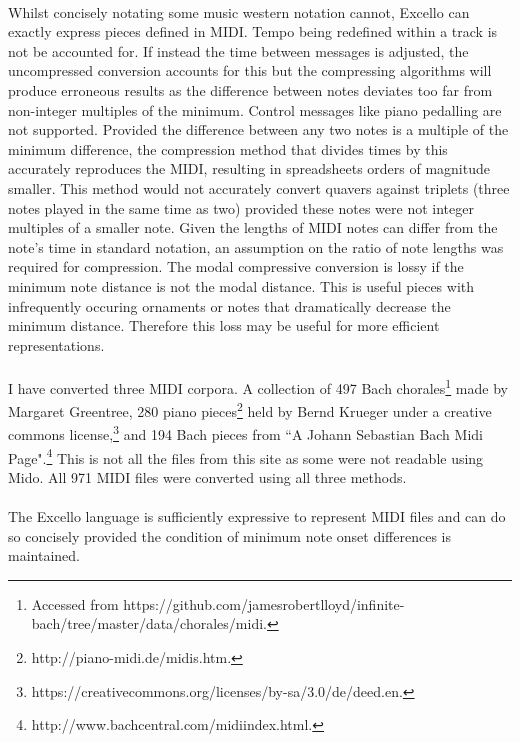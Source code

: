 \paragraph{} Whilst concisely notating some music western notation cannot, Excello can exactly express pieces defined in MIDI. Tempo being redefined within a track is not be accounted for. If instead the time between messages is adjusted, the uncompressed conversion accounts for this but the compressing algorithms will produce erroneous results as the difference between notes deviates too far from non-integer multiples of the minimum. Control messages like piano pedalling are not supported. Provided the difference between any two notes is a multiple of the minimum difference, the compression method that divides times by this accurately reproduces the MIDI, resulting in spreadsheets orders of magnitude smaller. This method would not accurately convert quavers against triplets (three notes played in the same time as two) provided these notes were not integer multiples of a smaller note. Given the lengths of MIDI notes can differ from the note's time in standard notation, an assumption on the ratio of note lengths was required for compression. The modal compressive conversion is lossy if the minimum note distance is not the modal distance. This is useful pieces with infrequently occuring ornaments or notes that dramatically decrease the minimum distance. Therefore this loss may be useful for more efficient representations.

\paragraph{} I have converted three MIDI corpora. A collection of 497 Bach chorales\footnote{Accessed from https://github.com/jamesrobertlloyd/infinite-bach/tree/master/data/chorales/midi.} made by Margaret Greentree, 280 piano pieces\footnote{http://piano-midi.de/midis.htm.} held by Bernd Krueger under a creative commons license,\footnote{https://creativecommons.org/licenses/by-sa/3.0/de/deed.en.} and 194 Bach pieces from ``A Johann Sebastian Bach Midi Page".\footnote{http://www.bachcentral.com/midiindex.html.} This is not all the files from this site as some were not readable using Mido. All 971 MIDI files were converted using all three methods.

\paragraph{} The Excello language is sufficiently expressive to represent MIDI files and can do so concisely provided the condition of minimum note onset differences is maintained.

